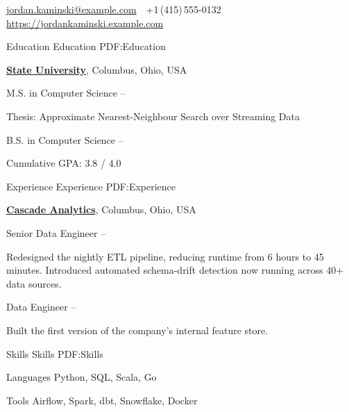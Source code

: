 \documentclass[letterpaper,MMMyyyy,nonstopmode]{simpleresumecv}
\newcommand{\CVAuthor}{Jordan Kaminski}
\newcommand{\CVWebpage}{https://jordankaminski.example.com}
\begin{document}
\Title{\CVAuthor}

\begin{SubTitle}
\href{mailto:jordan.kaminski@example.com}
{jordan.kaminski@example.com}
\,\SubBulletSymbol\,
+1\,(415)\,555-0132
\,\SubBulletSymbol\,
\href{\CVWebpage}
{\url{\CVWebpage}}
\end{SubTitle}

\begin{Body}

\Section
{Education}
{Education}
{PDF:Education}

\Entry
\href{https://www.example.edu}
{\textbf{State University}},
Columbus, Ohio, USA

\Gap
\BulletItem
M.S. in Computer Science
\hfill
{} --
\begin{Detail}
\SubBulletItem
Thesis: Approximate Nearest-Neighbour Search over Streaming Data
\end{Detail}

\Gap
\BulletItem
B.S. in Computer Science
\hfill
{} --
\begin{Detail}
\SubBulletItem
Cumulative GPA: 3.8 / 4.0
\end{Detail}

\Section
{Experience}
{Experience}
{PDF:Experience}

\Entry
\href{https://www.example.com}
{\textbf{Cascade Analytics}},
Columbus, Ohio, USA

\Gap
\BulletItem
Senior Data Engineer
\hfill
{} --
\Timestamp
\begin{Detail}
\SubBulletItem
Redesigned the nightly ETL pipeline, reducing runtime from 6 hours to 45 minutes.
\SubBulletItem
Introduced automated schema-drift detection now running across 40+ data sources.
\end{Detail}

\Gap
\BulletItem
Data Engineer
\hfill
{} --
\begin{Detail}
\SubBulletItem
Built the first version of the company's internal feature store.
\end{Detail}

\Section
{Skills}
{Skills}
{PDF:Skills}

\Entry
Languages
\hfill
Python, SQL, Scala, Go

\Gap
\Entry
Tools
\hfill
Airflow, Spark, dbt, Snowflake, Docker

\end{Body}
\end{document}

